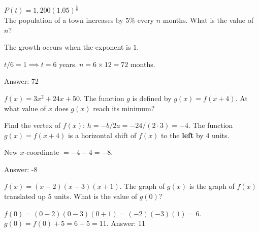 \documentclass[11pt,paper=a4,answers]{exam}
\begin{document}
\begin{questions}
\vspace{1cm}

\question
$P(t) = 1,200(1.05)^{\frac{t}{6}}$ \\
The population of a town increases by $5\%$ every $n$ months. What is the value of $n$?

\begin{solution}
The growth occurs when the exponent is $1$.
\vspace{5pt}
\begin{center}
$t / 6 = 1 \implies t = 6$ years.
\vspace{5pt}
$n = 6 \times 12 = 72$ months.
\end{center}
\vspace{5pt}
Answer: \colorbox{yellow!100}{72}
\end{solution}

\vspace{1cm}

\question
$f(x) = 3x^2 + 24x + 50$. The function $g$ is defined by $g(x) = f(x + 4)$. At what value of $x$ does $g(x)$ reach its minimum?

\begin{solution}
Find the vertex of $f(x)$: $h = -b/2a = -24 / (2 \cdot 3) = -4$.
\vspace{5pt}
The function $g(x) = f(x + 4)$ is a horizontal shift of $f(x)$ to the \textbf{left} by $4$ units.
\vspace{5pt}
\begin{center}
New $x$-coordinate $= -4 - 4 = -8$.
\end{center}
\vspace{5pt}
Answer: \colorbox{yellow!100}{-8}
\end{solution}

\vspace{1cm}

\question
$f(x) = (x - 2)(x - 3)(x + 1)$. The graph of $g(x)$ is the graph of $f(x)$ translated up $5$ units. What is the value of $g(0)$?

\begin{solution}
$f(0) = (0 - 2)(0 - 3)(0 + 1) = (-2)(-3)(1) = 6$.
\vspace{5pt}
$g(0) = f(0) + 5 = 6 + 5 = 11$.
\vspace{5pt}
Answer: \colorbox{yellow!100}{11}
\end{solution}

\vspace{1cm}


\end{questions}
\end{document}
